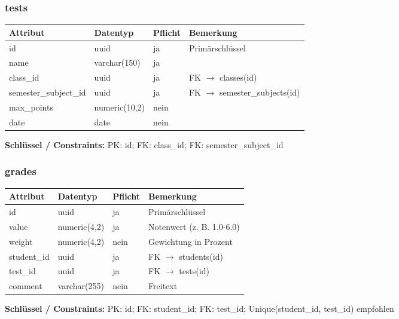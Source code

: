\documentclass[12pt,a4paper]{article}
\begin{document}
    \subsubsection{tests}
    \begin{longtable}{|L{4cm}|L{3cm}|L{3cm}|L{4cm}|}
        \hline
        \textbf{Attribut} & \textbf{Datentyp} & \textbf{Pflicht} & \textbf{Bemerkung} \\ \hline
        id & uuid & ja & Primärschlüssel \\ \hline
        name & varchar(150) & ja &  \\ \hline
        class\_id & uuid & ja & FK $\rightarrow$ classes(id) \\ \hline
        semester\_subject\_id & uuid & ja & FK $\rightarrow$ semester\_subjects(id) \\ \hline
        max\_points & numeric(10,2) & nein &  \\ \hline
        date & date & nein &  \\ \hline
    \end{longtable}
    \textbf{Schlüssel / Constraints:} PK: id; FK: class\_id; FK: semester\_subject\_id

    \subsubsection{grades}
    \begin{longtable}{|L{4cm}|L{3cm}|L{3cm}|L{4cm}|}
        \hline
        \textbf{Attribut} & \textbf{Datentyp} & \textbf{Pflicht} & \textbf{Bemerkung} \\ \hline
        id & uuid & ja & Primärschlüssel \\ \hline
        value & numeric(4,2) & ja & Notenwert (z. B. 1.0-6.0) \\ \hline
        weight & numeric(4,2) & nein & Gewichtung in Prozent \\ \hline
        student\_id & uuid & ja & FK $\rightarrow$ students(id) \\ \hline
        test\_id & uuid & ja & FK $\rightarrow$ tests(id) \\ \hline
        comment & varchar(255) & nein & Freitext \\ \hline
    \end{longtable}
    \textbf{Schlüssel / Constraints:} PK: id; FK: student\_id; FK: test\_id; Unique(student\_id, test\_id) empfohlen
\end{document}
